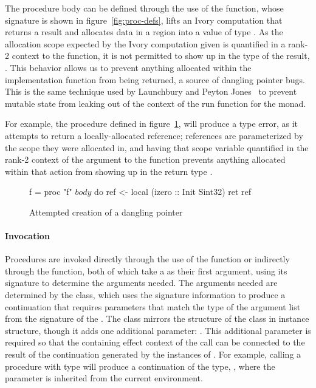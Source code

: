 The procedure body can be defined through the use of the  function,
whose signature is shown in figure~\ref{fig:proc-defs}, lifts an Ivory
computation that returns a result  and allocates data in a region 
into a value of type .  As the allocation scope expected by the Ivory
computation given is quantified in a rank-2 context to the  function,
it is not permitted to show up in the type of the result, .  This behavior
allows us to prevent anything allocated within the implementation function from
being returned, a source of dangling pointer bugs.  This is the same technique
used by Launchbury and Peyton Jones~\cite{stmonad} to prevent mutable state
from leaking out of the context of the run function for the  monad.

For example, the procedure  defined in figure~\ref{fig:proc-def}, will
produce a type error, as it attempts to return a locally-allocated reference;
references are parameterized by the scope they were allocated in, and having
that scope variable quantified in the rank-2 context of the argument to the
 function prevents anything allocated within that action from showing
up in the return type .

\begin{figure}[h]
\begin{code}
f = proc "f" $ body $ do
  ref <- local (izero :: Init Sint32)
  ret ref
\end{code}
\caption{Attempted creation of a dangling pointer}
\label{fig:proc-def}
\end{figure}

\paragraph{Invocation} Procedures are invoked directly through the use of the
 function or indirectly through the  function, both of which
take a  as their first argument, using its signature to determine the
arguments needed.  The arguments needed are determined by the 
class, which uses the signature information to produce a continuation that
requires parameters that match the type of the argument list from the signature
of the .  The  class mirrors the structure of the
 class in instance structure, though it adds one additional
parameter: .  This additional parameter is required so that the
containing effect context of the call can be connected to the result of the
continuation generated by the instances of .  For example, calling
a procedure with type  will produce a
continuation of the type, , where the 
parameter is inherited from the current environment.

